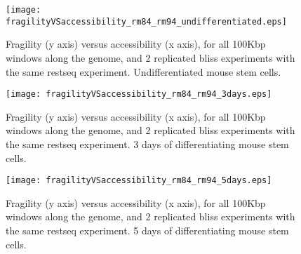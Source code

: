 \documentclass[11pt,a4paper]{article}
\begin{document}
\begin{figure}[hbtp]
\begin{minipage}[t]{0.45\textwidth}
\texttt{[image: fragilityVSaccessibility\_rm84\_rm94\_undifferentiated.eps]}
\caption{Fragility (y axis) versus accessibility (x axis), for all 100Kbp windows along the genome, and 2 replicated bliss experiments with the same restseq experiment. Undifferentiated mouse stem cells.}
\label{fig:fragilityVSaccessibility_rm84_rm94_undifferentiated}
\end{minipage}
\hspace{\fill}
\begin{minipage}[t]{0.45\textwidth}
\texttt{[image: fragilityVSaccessibility\_rm84\_rm94\_3days.eps]}
\caption{Fragility (y axis) versus accessibility (x axis), for all 100Kbp windows along the genome, and 2 replicated bliss experiments with the same restseq experiment. 3 days of differentiating mouse stem cells.}
\label{fig:fragilityVSaccessibility_rm84_rm94_3days}
\end{minipage}
\vspace*{0.5cm} %
\begin{minipage}[t]{0.45\textwidth}
\texttt{[image: fragilityVSaccessibility\_rm84\_rm94\_5days.eps]}
\caption{Fragility (y axis) versus accessibility (x axis), for all 100Kbp windows along the genome, and 2 replicated bliss experiments with the same restseq experiment. 5 days of differentiating mouse stem cells.}
\label{fig:fragilityVSaccessibility_rm84_rm94_5days}
\end{minipage}
\end{figure}
\end{document}
